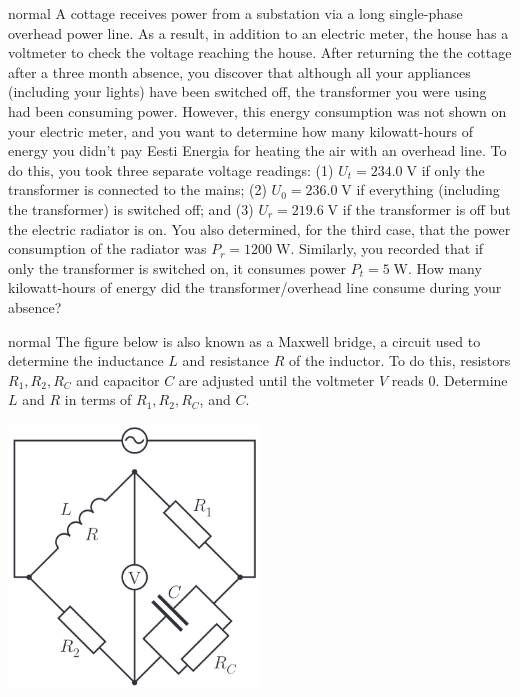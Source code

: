 \hypertarget{P154}{}
\begin{solution}{normal} %
A cottage receives power from a substation via a long single-phase overhead power line. As a result, in addition to an electric meter, the house has a voltmeter to check the voltage reaching the house. After returning the the cottage after a three month absence, you discover that although all your appliances (including your lights) have been switched off, the transformer you were using had been consuming power. However, this energy consumption was not shown on your electric meter, and you want to determine how many kilowatt-hours of energy you didn't pay Eesti Energia for heating the air with an overhead line. To do this, you took three separate voltage readings: (1) $U_t=234.0\;\text{V}$ if only the transformer is connected to the mains; (2) $U_0=236.0\;\text{V}$ if everything (including the transformer) is switched off; and (3) $U_r=219.6\;\text{V}$ if the transformer is off but the electric radiator is on. You also determined, for the third case, that the power consumption of the radiator was $P_r=1200\;\text{W}$. Similarly, you recorded that if only the transformer is switched on, it consumes power $P_t=5\;\text{W}$. How many kilowatt-hours of energy did the transformer/overhead line consume during your absence?
\end{solution}

\hypertarget{P155}{}
\begin{solution}{normal} %
The figure below is also known as a Maxwell bridge, a circuit used to determine the inductance $L$ and resistance $R$ of the inductor. To do this, resistors $R_1,R_2,R_C$ and capacitor $C$ are adjusted until the voltmeter $V$ reads $0$. Determine $L$ and $R$ in terms of $R_1,R_2,R_C$, and $C$.
\begin{center}
    \includegraphics[width=0.5\textwidth]{S6 Figures/S6-155.png}
\end{center}
\end{solution}

